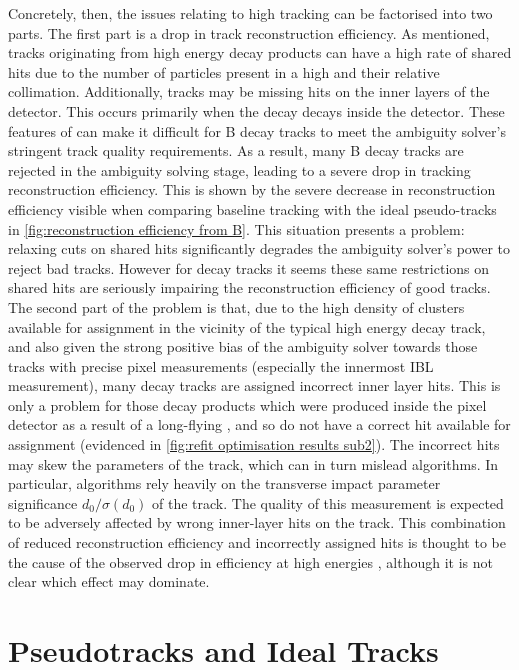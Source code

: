 Concretely, then, the issues relating to high \pT \bhadron tracking can be factorised into two parts. The first part is a drop in track reconstruction efficiency. As mentioned, tracks originating from high energy \bhadron decay products can have a high rate of shared hits due to the number of particles present in a high \pT \bjet and their relative collimation. Additionally, tracks may be missing hits on the inner layers of the detector. This occurs primarily when the decay \bhadron decays inside the detector. These features of can make it difficult for B decay tracks to meet the ambiguity solver's stringent track quality requirements. As a result, many B decay tracks are rejected in the ambiguity solving stage, leading to a severe drop in tracking reconstruction efficiency. This is shown by the severe decrease in reconstruction efficiency visible when comparing baseline tracking with the ideal pseudo-tracks in \cref{fig:reconstruction efficiency from B}. This situation presents a problem: relaxing cuts on shared hits significantly degrades the ambiguity solver's power to reject bad tracks. However for \bhadron decay tracks it seems these same restrictions on shared hits are seriously impairing the reconstruction efficiency of good tracks. The second part of the problem is that, due to the high density of clusters available for assignment in the vicinity of the typical high energy \bhadron decay track, and also given the strong positive bias of the ambiguity solver towards those tracks with precise pixel measurements (especially the innermost IBL measurement), many \bhadron decay tracks are assigned incorrect inner layer hits. This is only a problem for those decay products which were produced inside the pixel detector as a result of a long-flying \bhadron, and so do not have a correct hit available for assignment (evidenced in \cref{fig:refit optimisation results sub2}). The incorrect hits may skew the parameters of the track, which can in turn mislead \btagging algorithms. In particular, \btagging algorithms rely heavily on the transverse impact parameter significance $d_0/\sigma(d_0)$ of the track. The quality of this measurement is expected to be adversely affected by wrong inner-layer hits on the track. This combination of reduced reconstruction efficiency and incorrectly assigned hits is thought to be the cause of the observed drop in \btagging efficiency at high energies , although it is not clear which effect may dominate.


\section{Pseudotracks and Ideal Tracks}\label{sec:pseudo ideal tracking}

